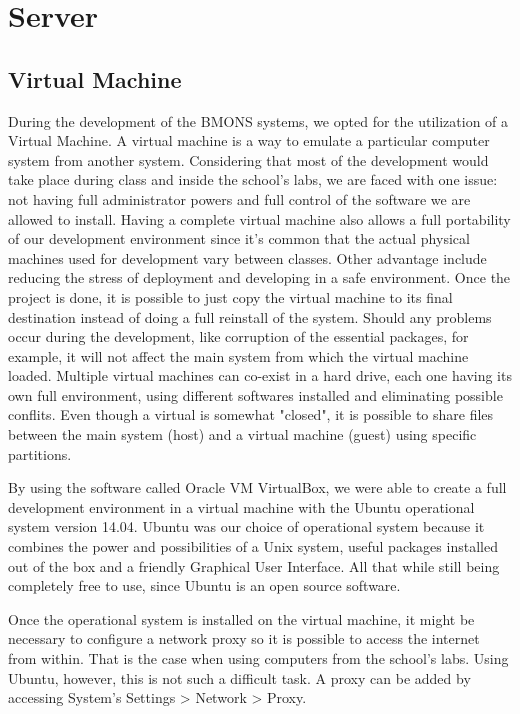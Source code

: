 \chapter{Server}
\section{Virtual Machine}

During the development of the BMONS systems, we opted for the utilization of a Virtual Machine. A virtual machine is a way to emulate a particular computer system from another system. Considering that most of the development would take place during class and inside the school's labs, we are faced with one issue: not having full administrator powers and full control of the software we are allowed to install. Having a complete virtual machine also allows a full portability of our development environment since it's common that the actual physical machines used for development vary between classes. Other advantage include reducing the stress of deployment and developing in a safe environment. Once the project is done, it is possible to just copy the virtual machine to its final destination instead of doing a full reinstall of the system. Should any problems occur during the development, like corruption of the essential packages, for example, it will not affect the main system from which the virtual machine loaded. Multiple virtual machines can co-exist in a hard drive, each one having its own full environment, using different softwares installed and eliminating possible conflits. Even though a virtual is somewhat "closed", it is possible to share files between the main system (host) and a virtual machine (guest) using specific partitions. 

By using the software called Oracle VM VirtualBox, we were able to create a full development environment in a virtual machine with the Ubuntu operational system version 14.04. Ubuntu was our choice of operational system because it combines the power and possibilities of a Unix system, useful packages installed out of the box and a friendly Graphical User Interface. All that while still being completely free to use, since Ubuntu is an open source software. 

Once the operational system is installed on the virtual machine, it might be necessary to configure a network proxy so it is possible to access the internet from within. That is the case when using computers from the school's labs. Using Ubuntu, however, this is not such a difficult task. A proxy can be added by accessing System's Settings > Network > Proxy. 

